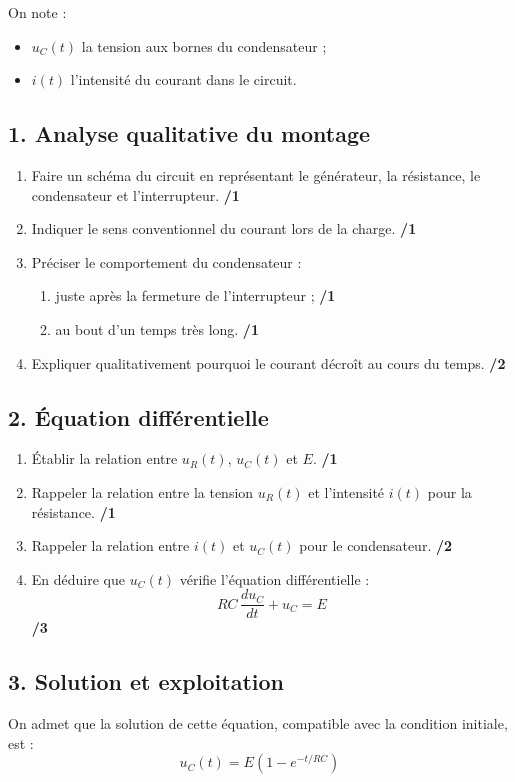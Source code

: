 \documentclass[11pt,a4paper]{article}
\begin{document}
On note :
\begin{itemize}
    \item \(u_C(t)\) la tension aux bornes du condensateur ;
    \item \(i(t)\) l'intensité du courant dans le circuit.
\end{itemize}

\subsection*{1. Analyse qualitative du montage}
\begin{enumerate}
    \item Faire un schéma du circuit en représentant le générateur, la résistance, le condensateur et l'interrupteur. \hfill \textbf{/1}
    \item Indiquer le sens conventionnel du courant lors de la charge. \hfill \textbf{/1}
    \item Préciser le comportement du condensateur :
    \begin{enumerate}[label=\alph*)]
        \item juste après la fermeture de l'interrupteur ; \hfill \textbf{/1}
        \item au bout d'un temps très long. \hfill \textbf{/1}
    \end{enumerate}
    \item Expliquer qualitativement pourquoi le courant décroît au cours du temps. \hfill \textbf{/2}
\end{enumerate}

\subsection*{2. Équation différentielle}
\begin{enumerate}
    \item Établir la relation entre \(u_R(t)\), \(u_C(t)\) et \(E\). \hfill \textbf{/1}
    \item Rappeler la relation entre la tension \(u_R(t)\) et l'intensité \(i(t)\) pour la résistance. \hfill \textbf{/1}
    \item Rappeler la relation entre \(i(t)\) et \(u_C(t)\) pour le condensateur. \hfill \textbf{/2}
    \item En déduire que \(u_C(t)\) vérifie l'équation différentielle :
    \[
    RC\,\frac{du_C}{dt}+u_C=E
    \]
    \hfill \textbf{/3}
\end{enumerate}

\subsection*{3. Solution et exploitation}
On admet que la solution de cette équation, compatible avec la condition initiale, est :
\[
u_C(t)=E\left(1-e^{-t/RC}\right)
\]
\end{document}
